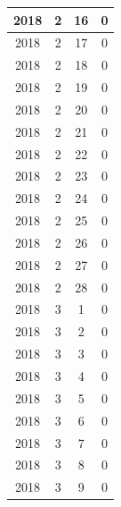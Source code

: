 \begin{longtable} {|c|c|c|c|}
\hline
2018         & 2            & 16           & 0                         \\ 
\hline
2018         & 2            & 17           & 0                         \\ 
\hline
2018         & 2            & 18           & 0                         \\ 
\hline
2018         & 2            & 19           & 0                         \\ 
\hline
2018         & 2            & 20           & 0                         \\ 
\hline
2018         & 2            & 21           & 0                         \\ 
\hline
2018         & 2            & 22           & 0                         \\ 
\hline
2018         & 2            & 23           & 0                         \\ 
\hline
2018         & 2            & 24           & 0                         \\ 
\hline
2018         & 2            & 25           & 0                         \\ 
\hline
2018         & 2            & 26           & 0                         \\ 
\hline
2018         & 2            & 27           & 0                         \\ 
\hline
2018         & 2            & 28           & 0                         \\ 
\hline
2018         & 3            & 1            & 0                         \\ 
\hline
2018         & 3            & 2            & 0                         \\ 
\hline
2018         & 3            & 3            & 0                         \\ 
\hline
2018         & 3            & 4            & 0                         \\ 
\hline
2018         & 3            & 5            & 0                         \\ 
\hline
2018         & 3            & 6            & 0                         \\ 
\hline
2018         & 3            & 7            & 0                         \\ 
\hline
2018         & 3            & 8            & 0                         \\ 
\hline
2018         & 3            & 9            & 0                         \\ 

\end{longtable}
